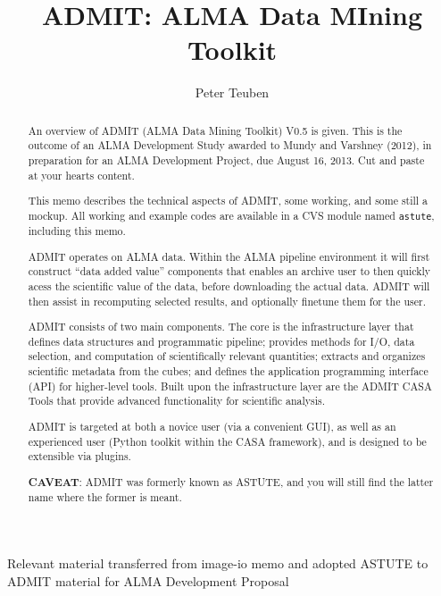 \documentclass[preprint]{aastex} %
\begin{document}

\title{ADMIT: ALMA Data MIning Toolkit}

\author{Peter Teuben}

\begin{abstract}

An overview of ADMIT (ALMA Data Mining Toolkit) V0.5 is given. This is
the outcome of an ALMA Development Study awarded to Mundy and Varshney
(2012), in preparation for an ALMA Development Project, due August 16,
2013. Cut and paste at your hearts content.

This memo describes the technical aspects of ADMIT, some working, and
some still a mockup. All working and example codes are available in a
CVS module named {\tt astute}, including this memo.

ADMIT operates on ALMA data. Within the ALMA pipeline environment
it will first construct ``data added value'' components that enables
an archive user to then quickly acess the scientific value of the data,
before downloading the actual data. ADMIT will then assist in
recomputing selected results, and optionally finetune them for the user.


ADMIT consists of two main components. The core is the infrastructure layer
that defines data structures and programmatic pipeline; provides methods
for I/O, data selection, and computation of scientifically relevant
quantities; extracts and organizes scientific metadata from the cubes; and
defines the application programming interface (API) for higher-level tools.
Built upon the infrastructure layer are the ADMIT CASA Tools that provide
advanced functionality for scientific analysis.


ADMIT is targeted at both a novice user (via a convenient GUI), as
well as an experienced user (Python toolkit within the CASA
framework), and is designed to be extensible via plugins.

\bigskip
{\bf CAVEAT}: ADMIT was formerly known as ASTUTE, and you will still
find the latter name where the former is meant.


\end{abstract}


\ChangeRecordBegin
{}
{Relevant material transferred from image-io memo and adopted ASTUTE to ADMIT}
{material for ALMA Development Proposal}
\ChangeRecordEnd
\end{document}
